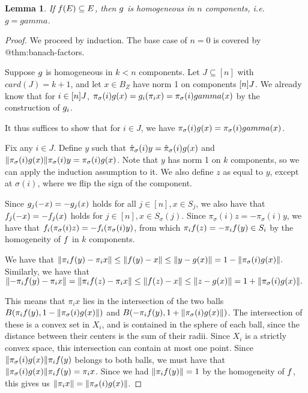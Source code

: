 \documentclass{amsart}
\newtheorem{lemma}{Lemma}
\theoremstyle{definition}
\begin{document}
\begin{lemma} \label{lem:g-homogeneous}
    \annotation
    If $f(E) \subseteq E$, then $g$ is homogeneous in $n$ components, i.e. $g = gamma$.
\end{lemma}

\begin{proof}
    We proceed by induction. The base case of $n=0$ is covered by @thm:banach-factors.

    Suppose $g$ is homogeneous in $k < n$ components. Let $J \subseteq [n]$ with
    $card(J) = k+1$, and let $x \in B_Z$ have norm 1 on components $[n] \\ J$. We
    already know that for $i \in [n]\\J$, $\pi_\sigma(i) g(x) = g_i (\pi_i x)
    = \pi_\sigma(i) gamma (x)$ by
    the construction of $g_i$.
  
    It thus suffices to show that for $i \in J$, we have $\pi_\sigma(i) g(x) =
    \pi_\sigma(i) gamma(x)$.
  
      Fix any $i \in J$. Define $y$ such that $\hat{\pi}_\sigma(i) y = \hat{\pi}_\sigma(i) g(x)$ and $\norm{\pi_\sigma(i) g(x)} \pi_\sigma(i) y = \pi_\sigma(i) g(x)$. Note that
      $y$ has norm 1 on $k$ components, so we can apply the induction assumption to it.
      We also define $z$ as equal to $y$, except at $\sigma(i)$, where we flip the
      sign of the component.
  
  
  
      Since $g_j (-x) = -g_j (x)$ holds for all $j \in [n], x \in S_j$, we also have that
      $f_j (-x) = -f_j (x)$ holds for
      $j \in [n], x \in S_\sigma(j)$. Since $\pi_\sigma(i) z = -\pi_\sigma(i) y$, we have that
    $f_i (\pi_\sigma(i) z) = -f_i (\pi_\sigma(i) y)$, from which
    $\pi_i f(z) = -\pi_i f(y) \in S_i$ by the homogeneity of $f$ in $k$ components.
  
    We have that
    $ \norm{\pi_i f(y) - \pi_i x} \leq \norm{f(y) - x} \leq \norm{y - g(x)} = 1 - \norm{\pi_\sigma(i) g(x)}. $
      Similarly, we have that
    $ \norm{-\pi_i f(y) - \pi_i x} = \norm{\pi_i f(z) - \pi_i x} \leq \norm{f(z) - x} \leq \norm{z - g(x)} = 1 + \norm{\pi_\sigma(i) g(x)}. $
  
  
    This means that $\pi_i x$ lies in the
      intersection of the two balls $B(\pi_i f(y), 1-\norm{\pi_\sigma(i) g(x)})$ and
      $B(-\pi_i f(y), 1+\norm{\pi_\sigma(i) g(x)})$. The intersection of these is a convex
      set in $X_i$, and is contained in the sphere of each ball, since the distance between their centers is the sum of their radii. Since $X_i$ is a strictly
      convex space, this intersection can contain at most one point. Since
    $\norm{\pi_\sigma(i) g(x)}\pi_i f(y)$ belongs to both balls, we must have that
      $\norm{\pi_\sigma(i) g(x)}\pi_i f(y) = \pi_i x$. Since we had $\norm{\pi_i f(y)}=1$
      by the homogeneity of $f$, this gives us
    $\norm{\pi_i x} = \norm{\pi_\sigma(i) g(x)}$.
  

\end{proof}
\end{document}
